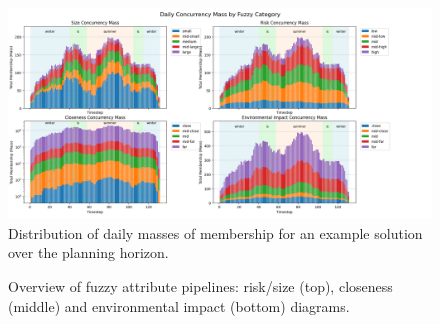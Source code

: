 \clearpage                 %
\begin{figure}[!p]
    \begin{adjustwidth}{-1.2cm}{-1.8cm}
    \includegraphics[width=1.07\linewidth]{ch3/figures/Fuzzy_att_concurrency.png}
    \end{adjustwidth}
    \caption{Distribution of daily masses of membership for an example solution over the planning horizon.}
    \label{fig:fuzzy_att_concurrency}
\end{figure}
\begin{figure}[!p]
    \centering                          %
    \begin{adjustwidth}{-1.6cm}{-1.6cm}
  
  
      \vspace{1.5ex}
  
  
      \vspace{1.5ex}
  
  
    \end{adjustwidth}
  
    \caption{Overview of fuzzy attribute pipelines: risk/size (top), closeness (middle) and environmental
             impact (bottom) diagrams.}
    \label{fig:risk-size_closeness_envimpact}
  \end{figure}

\thispagestyle{empty}
  \restoregeometry          %
\clearpage   
